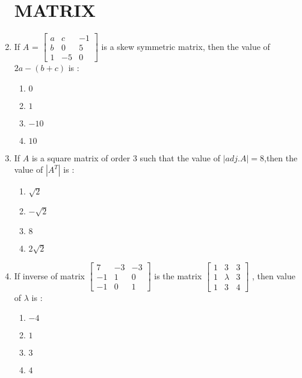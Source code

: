 \documentclass{article}
\providecommand{\myvec}[1]{\ensuremath{\begin{bmatrix}#1\end{bmatrix}}}
\begin{document}
		\begin{enumerate}
			\section{MATRIX}
		\item If $A$ = $\myvec{a & c & -1 \\b & 0 & 5\\1 & -5 & 0}$ is a skew symmetric matrix, then the value of $2a - (b+c)$ is :                                                   \begin{enumerate}[label=(\Alph*)]
        \item ${0}$
        \item ${1}$
        \item ${-10}$
        \item ${10}$
        \end{enumerate}

\item If $A$ is a square matrix of order $3$ such that the value of $|adj.A| = 8$,then the value of $|A^T|$ is :                                                                      \begin{enumerate}[label=(\Alph*)]
                \item $\sqrt{2}$
                        \item $-\sqrt{2}$
                        \item $8$
                        \item $2 \sqrt{2}$
        \end{enumerate}


        \item If inverse of matrix $\myvec{7 & -3 & -3 \\-1 & 1 & 0\\-1 & 0 & 1}$ is the matrix $\myvec{1 & 3 & 3\\1 & \lambda & 3\\1 & 3 & 4}$ ,  then value of $\lambda$ is :                                                                                          \begin{enumerate}[label=(\Alph*)]
                \item $-4$
                        \item $1$
                        \item$3$                                                                           \item $4$                                                          \end{enumerate}



\end{enumerate}
\end{document}
